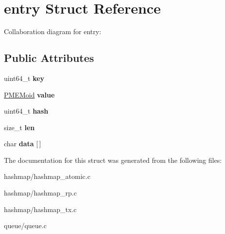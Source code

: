 \hypertarget{structentry}{}\section{entry Struct Reference}
\label{structentry}


Collaboration diagram for entry\+:
\subsection*{Public Attributes}
\begin{DoxyCompactItemize}
\item 
\mbox{\label{structentry_a9baabf5b8c35d0a925340cd73e23ae8d}} 
uint64\+\_\+t {\bfseries key}
\item 
\mbox{\label{structentry_abc6a75d6690199042034e9300aebd4c1}} 
\hyperlink{structpmemoid}{P\+M\+E\+Moid} {\bfseries value}
\item 
\mbox{\label{structentry_a97cd1dbcdcea14e94f70a86a391b662b}} 
uint64\+\_\+t {\bfseries hash}
\item 
\mbox{\label{structentry_a8ac9b199255dffa2da0510ee7f85c4e4}} 
size\+\_\+t {\bfseries len}
\item 
\mbox{\label{structentry_aaf5d81a7428014e8bb4711f33ff134eb}} 
char {\bfseries data} \mbox{[}$\,$\mbox{]}
\end{DoxyCompactItemize}


The documentation for this struct was generated from the following files\+:\begin{DoxyCompactItemize}
\item 
hashmap/hashmap\+\_\+atomic.\+c\item 
hashmap/hashmap\+\_\+rp.\+c\item 
hashmap/hashmap\+\_\+tx.\+c\item 
queue/queue.\+c\end{DoxyCompactItemize}
